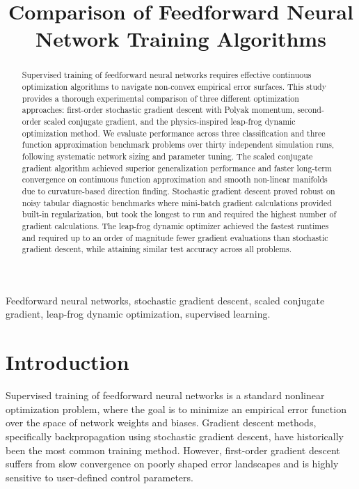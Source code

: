 \documentclass[conference,10pt]{IEEEtran}
\begin{document}
\title{Comparison of Feedforward Neural Network Training Algorithms}

\author{
}

\maketitle

\begin{abstract}
Supervised training of feedforward neural networks requires effective continuous optimization algorithms to navigate non-convex empirical error surfaces. This study provides a thorough experimental comparison of three different optimization approaches: first-order stochastic gradient descent with Polyak momentum, second-order scaled conjugate gradient, and the physics-inspired leap-frog dynamic optimization method. We evaluate performance across three classification and three function approximation benchmark problems over thirty independent simulation runs, following systematic network sizing and parameter tuning. The scaled conjugate gradient algorithm achieved superior generalization performance and faster long-term convergence on continuous function approximation and smooth non-linear manifolds due to curvature-based direction finding. Stochastic gradient descent proved robust on noisy tabular diagnostic benchmarks where mini-batch gradient calculations provided built-in regularization, but took the longest to run and required the highest number of gradient calculations. The leap-frog dynamic optimizer achieved the fastest runtimes and required up to an order of magnitude fewer gradient evaluations than stochastic gradient descent, while attaining similar test accuracy across all problems.
\end{abstract}

\begin{IEEEkeywords}
Feedforward neural networks, stochastic gradient descent, scaled conjugate gradient, leap-frog dynamic optimization, supervised learning.
\end{IEEEkeywords}

\section{Introduction}
Supervised training of feedforward neural networks is a standard nonlinear optimization problem, where the goal is to minimize an empirical error function over the space of network weights and biases. Gradient descent methods, specifically backpropagation using stochastic gradient descent, have historically been the most common training method. However, first-order gradient descent suffers from slow convergence on poorly shaped error landscapes and is highly sensitive to user-defined control parameters.
\end{document}
